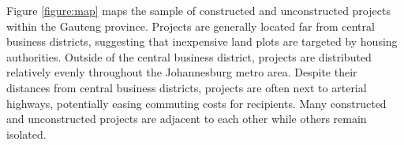 \documentclass[12pt]{article}
\begin{document}
Figure \ref{figure:map} maps the sample of constructed and unconstructed projects within the Gauteng province.  Projects are generally located far from central business districts, suggesting that inexpensive land plots are targeted by housing authorities.  Outside of the central business district, projects are distributed relatively evenly throughout the Johannesburg metro area.  Despite their distances from central business districts, projects are often next to arterial highways, potentially easing commuting costs for recipients.  Many constructed and unconstructed projects are adjacent to each other while others remain isolated.  




\end{document}
